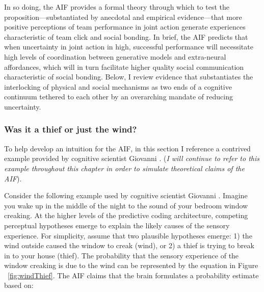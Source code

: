 \begin{CJK}{UTF8}{gbsn}
In so doing, the AIF provides a formal theory through which to test the proposition---substantiated by anecdotal and empirical evidence---that more positive perceptions of team performance in joint action generate experiences characteristic of team click and social bonding.  In brief, the AIF predicts that when uncertainty in joint action in high, successful performance will necessitate high levels of coordination between generative models and extra-neural affordances, which will in turn facilitate higher quality social communication characteristic of social bonding.  Below, I review evidence that substantiates the interlocking of physical and social mechanisms as two ends of a cognitive continuum tethered to each other by an overarching mandate of reducing uncertainty.




\subsubsection{Was it a thief or just the wind?\label{sect:windThief}}
To help develop an intuition for the AIF, in this section I reference a contrived example provided by cognitive scientist Giovanni \textcite{Pezzulo2014}.  (\textit{I will continue to refer to this example throughout this chapter in order to simulate theoretical claims of the AIF}).

Consider the following example used by cognitive scientist Giovanni \textcite{Pezzulo2014}.  Imagine you wake up in the middle of the night to the sound of your bedroom window creaking.  At the higher levels of the predictive coding architecture, competing perceptual hypotheses emerge to explain the likely causes of the sensory experience.  For simplicity, assume that two plausible hypotheses emerge: 1) the wind outside caused the window to creak (wind), or 2) a thief is trying to break in to your house (thief).  The probability that the sensory experience of the window creaking is due to the wind can be represented by the equation in Figure ~\ref{fig:windThief}. The AIF claims that the brain formulates a probability estimate based on:


\end{CJK}
